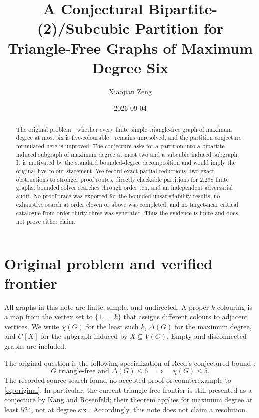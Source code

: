 \documentclass[11pt]{amsart}
\title[Conjectural Bipartite--Subcubic Partition]{A Conjectural Bipartite-(2)/Subcubic Partition for Triangle-Free Graphs of Maximum Degree Six}
\author{Xiaojian Zeng}
\date{2026-09-04}
\theoremstyle{definition}
\begin{document}
\begin{abstract}
The original problem---whether every finite simple triangle-free graph of
maximum degree at most six is five-colourable---remains unresolved, and the
partition conjecture formulated here is unproved.  The conjecture asks for a
partition into a bipartite induced subgraph of maximum degree at most two and
a subcubic induced subgraph.  It is motivated by the standard bounded-degree
decomposition and would imply the original five-colour statement.  We record
exact partial reductions, two exact obstructions to stronger proof routes,
directly checkable partitions for 2,298 finite graphs, bounded solver searches
through order ten, and an independent adversarial audit.  No proof trace was
exported for the bounded unsatisfiability results, no exhaustive search at
order eleven or above was completed, and no target-near critical catalogue
from order thirty-three was generated.  Thus the evidence is finite and does
not prove either claim.
\end{abstract}

\maketitle

\section{Original problem and verified frontier}

All graphs in this note are finite, simple, and undirected.  A proper
$k$-colouring is a map from the vertex set to $\{1,\ldots,k\}$ that assigns
different colours to adjacent vertices.  We write $\chi(G)$ for the least
such $k$, $\Delta(G)$ for the maximum degree, and $G[X]$ for the subgraph
induced by $X\subseteq V(G)$.  Empty and disconnected graphs are included.

The original question is the following specialization of Reed's conjectured
bound \cite{Reed1998}:
\begin{equation}\label{eq:original}
  G\text{ triangle-free and }\Delta(G)\leq 6
  \quad\Longrightarrow\quad \chi(G)\leq 5.
\end{equation}
The recorded source search found no accepted proof or counterexample to
\eqref{eq:original}.  In particular, the current triangle-free frontier is
still presented as a conjecture by Kang and Rosenfeld; their theorem applies
for maximum degree at least $524$, not at degree six \cite{KangRosenfeld2025}.
Accordingly, this note does not claim a resolution.
\end{document}
